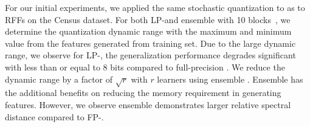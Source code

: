 For our initial experiments, we applied the same stochastic quantization to \Nystrom as to RFFs on the Census dataset. For both LP-\Nystrom and ensemble \Nystrom with 10 blocks~\cite{ensemble09}, we determine the quantization dynamic range with the maximum and minimum value from the \Nystrom features generated from training set. Due to the large dynamic range, we observe for LP-\NystromNS, the generalization performance degrades significant with less than or equal to 8 bits compared to full-precision \NystromNS. We reduce the dynamic range by a factor of $\sqrt{r}$ with $r$ learners using ensemble \NystromNS. Ensemble \Nystrom has the additional benefits on reducing the memory requirement in generating \Nystrom features. However, we observe ensemble \Nystrom demonstrates larger relative spectral distance compared to FP-\Nystrom.





